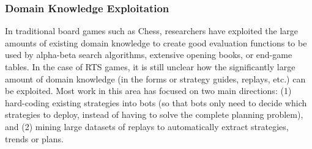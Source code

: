 \documentclass{llncs}
\begin{document}
\subsubsection{Domain Knowledge Exploitation}
In traditional board  games such as Chess,  researchers have exploited
the  large  amounts  of  existing  domain  knowledge  to  create  good
evaluation  functions  to be  used  by  alpha-beta search  algorithms,
extensive opening books, or end-game tables. In the case of RTS games,
it  is still  unclear how  the  significantly large  amount of  domain
knowledge  (in the  forms or  strategy guides,  replays, etc.)  can be
exploited. Most  work in  this area has  focused on  two main
directions: (1) hard-coding existing strategies into bots (so that  bots only  need to
decide  which strategies  to deploy,  instead of  having to  solve the
complete  planning problem), and (2) mining large datasets
of  replays \cite{WeberCig09,synnaeve2012dataset} to automatically extract
 strategies,  trends   or  plans. %
\end{document}
